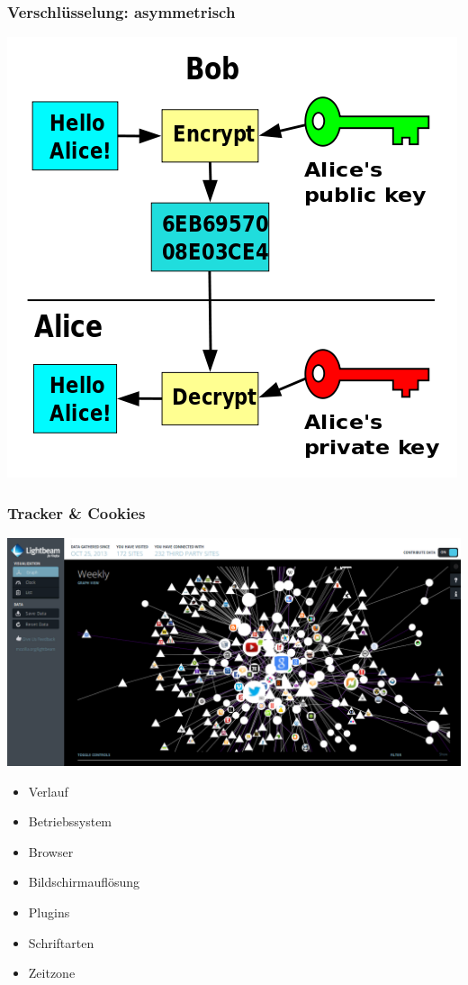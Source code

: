 \documentclass[12pt, table]{beamer}
\begin{document}
\begin{frame}
    \frametitle{Verschlüsselung: asymmetrisch}
    \includegraphics[height=0.7\textheight]{../img/asym_encryption.png}
\end{frame}

\begin{frame}
    \frametitle{Tracker \& Cookies}
    \begin{center}
    	\includegraphics[height=0.7\textheight]{../img/lightbeam.png}
    \end{center}
\end{frame}

\begin{frame}
	\begin{itemize}
		\item Verlauf
	    \item Betriebssystem
    	\item Browser
      	\item Bildschirmauflösung
      	\item Plugins
      	\item Schriftarten
      	\item Zeitzone
	\end{itemize}
\end{frame}
\end{document}
